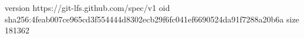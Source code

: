 version https://git-lfs.github.com/spec/v1
oid sha256:4feab007ce965cd3f554444d8302ecb29f6fc041ef6690524da91f7288a20b6a
size 181362
